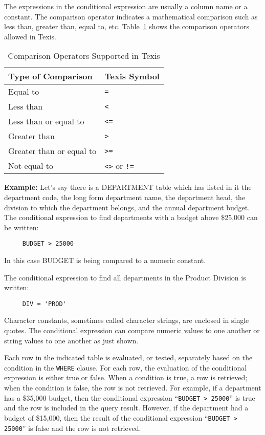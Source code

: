 The expressions in the conditional expression are usually a column
name or a constant.  The comparison operator indicates a mathematical
comparison such as less than, greater than, equal to, etc.
Table~\ref{tab:CompOp} shows the comparison operators allowed in
Texis.

\begin{table}
\caption{Comparison Operators Supported in Texis}{\label{tab:CompOp}}
\begin{center}
\begin{tabular}{|l|l|} \hline
Type of Comparison       & Texis Symbol \\ \hline\hline
Equal to                 &  \verb`=`        \\
Less than                &  \verb`<`        \\
Less than or equal to    &  \verb`<=`       \\
Greater than             &  \verb`>`        \\
Greater than or equal to &  \verb`>=`       \\
Not equal to             &  \verb`<>` or \verb`!=`  \\ \hline
\end{tabular}
\end{center}
\end{table}

{\bf Example:}
Let's say there is a DEPARTMENT table which has listed in it the
department code, the long form department name, the department head,
the division to which the department belongs, and the annual
department budget.  The conditional expression to find departments
with a budget above \$25,000 can be written:
\begin{verbatim}
     BUDGET > 25000
\end{verbatim}
In this case BUDGET is being compared to a numeric constant.

The conditional expression to find all departments in the Product
Division is written:
\begin{verbatim}
     DIV = 'PROD'
\end{verbatim}
Character constants, sometimes called character strings, are enclosed
in single quotes.  The conditional expression can compare numeric
values to one another or string values to one another as just shown.

Each row in the indicated table is evaluated, or tested, separately
based on the condition in the \verb`WHERE` clause.  For each row, the
evaluation of the conditional expression is either true or false.
When a condition is true, a row is retrieved; when the condition is
false, the row is not retrieved.  For example, if a department has a
\$35,000 budget, then the conditional expression
``\verb`BUDGET > 25000`'' is true and the row is included in the query
result.  However, if the department had a budget of \$15,000, then the
result of the conditional expression ``\verb`BUDGET > 25000`'' is
false and the row is not retrieved.

